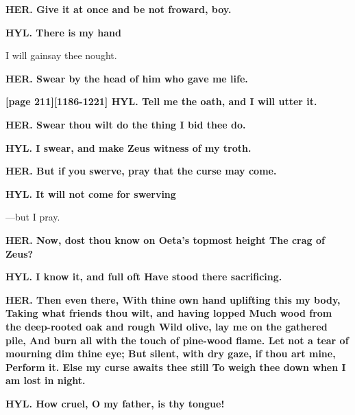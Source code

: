 \documentclass[11pt,letter]{book}
\begin{document}
\par \textbf{HER. Give it at once and be not froward, boy.}
\par 

\par \textbf{HYL. There is my hand}
\par   I will gainsay thee nought.

\par \textbf{HER. Swear by the head of him who gave me life.}
\par 

\par \textbf{[page 211][1186-1221] HYL. Tell me the oath, and I will utter it.}
\par 

\par \textbf{HER. Swear thou wilt do the thing I bid thee do.}
\par 

\par \textbf{HYL. I swear, and make Zeus witness of my troth.}
\par 

\par \textbf{HER. But if you swerve, pray that the curse may come.}
\par 

\par \textbf{HYL. It will not come for swerving}
\par  —but I pray.

\par \textbf{HER. Now, dost thou know on Oeta’s topmost height The crag of Zeus?}
\par 

\par \textbf{HYL. I know it, and full oft Have stood there sacrificing.}
\par 

\par \textbf{HER. Then even there, With thine own hand uplifting this my body, Taking what friends thou wilt, and having lopped Much wood from the deep-rooted oak and rough Wild olive, lay me on the gathered pile, And burn all with the touch of pine-wood flame. Let not a tear of mourning dim thine eye; But silent, with dry gaze, if thou art mine, Perform it. Else my curse awaits thee still To weigh thee down when I am lost in night.}
\par 

\par \textbf{HYL. How cruel, O my father, is thy tongue!}
\par 
\end{document}
